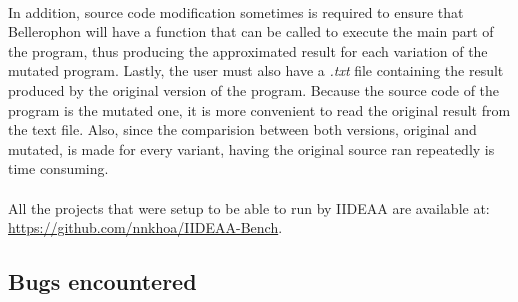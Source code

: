 ~\\
In addition, source code modification sometimes is required to ensure that Bellerophon will have a function that can be called to execute the main part of the program, thus producing the approximated result for each variation of the mutated program. Lastly, the user must also have a \textit{.txt} file containing the result produced by the original version of the program. Because the source code of the program is the mutated one, it is more convenient to read the original result from the text file. Also, since the comparision between both versions, original and mutated, is made for every variant, having the original source ran repeatedly is time consuming. \\
~\\
All the projects that were setup to be able to run by IIDEAA are available at: \url{https://github.com/nnkhoa/IIDEAA-Bench}. \\

\subsection{Bugs encountered}

